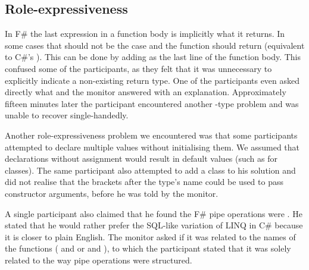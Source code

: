 \subsection{Role-expressiveness}
In F\# the last expression in a function body is implicitly what it returns. In some cases that should not be the case and the function should return  (equivalent to C\#'s ). This can be done by adding \ttt{()} as the last line of the function body. This confused some of the participants, as they felt that it was unnecessary to explicitly indicate a non-existing return type. One of the participants even asked directly what  and the monitor answered with an explanation. Approximately fifteen minutes later the participant encountered another -type problem and was unable to recover single-handedly.

Another role-expressiveness problem we encountered was that some participants attempted to  declare multiple values without initialising them. We assumed that  declarations without assignment would result in default values (such as  for classes). The same participant also attempted to add a class to his solution and did not realise that the brackets after the type's name could be used to pass constructor arguments, before he was told by the monitor.

A single participant also claimed that he found the F\# pipe operations were . He stated that he would rather prefer the SQL-like variation of \gls{LINQ} in C\# because it is closer to plain English. The monitor asked if it was related to the names of the functions ( and  or  and ), to which the participant stated that it was solely related to the way pipe operations were structured.
